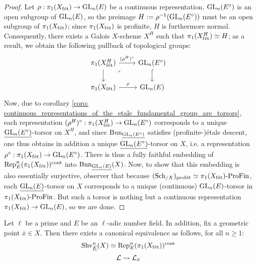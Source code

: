             \begin{proof}
                Let $\rho: \pi_1(X_{\mathrm{f\acute{e}t}}) \to \operatorname{GL}_n(E)$ be a continuous representation. $\operatorname{GL}_n(E^{\circ})$ is an open subgroup of $\operatorname{GL}_n(E)$, so the preimage $H := \rho^{-1}(\operatorname{GL}_n(E^{\circ}))$ must be an open subgroup of $\pi_1(X_{\mathrm{f\acute{e}t}})$; since $\pi_1(X_{\mathrm{f\acute{e}t}})$ is profinite, $H$ is furthermore normal. Consequently, there exists a Galois $X$-scheme $X^H$ such that $\pi_1(X^H_{\mathrm{f\acute{e}t}}) \simeq H$; as a result, we obtain the following pullback of topological groups:
                    $$
                        \begin{tikzcd}
                        	{\pi_1(X^H_{\fet})} & {\GL_n(E^{\circ})} \\
                        	{\pi_1(X_{\fet})} & {\GL_n(E)}
                        	\arrow[hook, from=1-2, to=2-2]
                        	\arrow["\rho", from=2-1, to=2-2]
                        	\arrow[from=1-1, to=2-1]
                        	\arrow["{(\rho^H)^{\circ}}", from=1-1, to=1-2]
                        	\arrow["\lrcorner"{anchor=center, pos=0.125}, draw=none, from=1-1, to=2-2]
                        \end{tikzcd}
                    $$
                Now, due to corollary \ref{coro: continuous_representations_of_the_etale_fundamental_group_are_torsors}, each representation $(\rho^H)^{\circ}: \pi_1(X^H_{\mathrm{f\acute{e}t}}) \to \operatorname{GL}_n(E^{\circ})$ corresponds to a unique $\underline{\operatorname{GL}_n(E^{\circ})}$-torsor on $X^H$, and since $\mathrm{Bun}_{\underline{\operatorname{GL}_n(E^{\circ})}}$ satisfies (profinite-)\'etale descent, one thus obtains in addition a unique $\underline{\operatorname{GL}_n(E^{\circ})}$-torsor on $X$, i.e. a representation $\rho^{\circ}: \pi_1(X_{\mathrm{f\acute{e}t}}) \to \operatorname{GL}_n(E^{\circ})$. There is thus a fully faithful embedding of $\mathrm{Rep}_E^n(\pi_1(X_{\mathrm{f\acute{e}t}}))^{\mathrm{cont}}$ into $\mathrm{Bun}_{\underline{\operatorname{GL}_n(E)}}(X)$. Now, to show that this embedding is also essentially surjective, observer that because $(\mathrm{Sch}_{/X})_{\mathrm{prof\acute{e}t}} \simeq \pi_1(X_{\mathrm{f\acute{e}t}})\text{-}\mathrm{Pro}\mathrm{Fin}$, each $\underline{\operatorname{GL}_n(E)}$-torsor on $X$ corresponds to a unique (continuous) $\operatorname{GL}_n(E)$-torsor in $\pi_1(X_{\mathrm{f\acute{e}t}})\text{-}\mathrm{Pro}\mathrm{Fin}$. But such a torsor is nothing but a continuous representation $\pi_1(X_{\mathrm{f\acute{e}t}}) \to \operatorname{GL}_n(E)$, so we are done.
            \end{proof}
        \begin{corollary} \label{coro: representations_of_the_etale_fundamental_group}
            Let $\ell$ be a prime and $E$ be an $\ell$-adic number field. In addition, fix a geometric point $\bar{x} \in X$. Then there exists a canonical equivalence as follows, for all $n \geq 1$:
                $$\mathrm{Shv}^n_{\underline{E}}(X) \simeq \mathrm{Rep}_E^n(\pi_1(X_{\mathrm{f\acute{e}t}}))^{\mathrm{cont}}$$
                $$\mathcal{L} \leadsto \mathcal{L}_{\bar{x}}$$
        \end{corollary}
            
